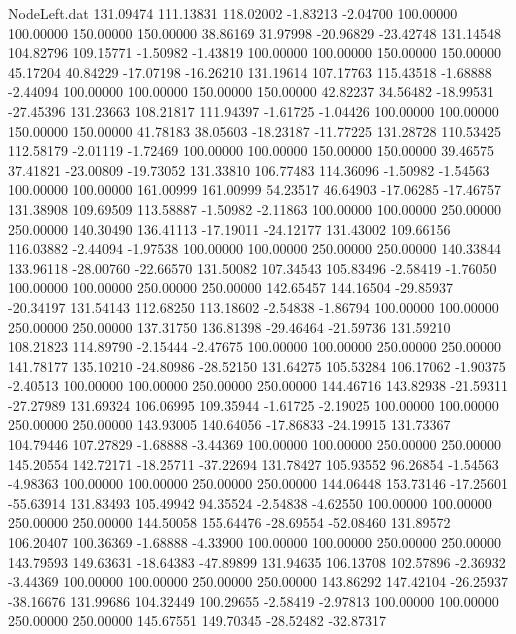 \begin{filecontents}{NodeLeft.dat}
 131.09474  111.13831  118.02002    -1.83213   -2.04700  100.00000  100.00000  150.00000  150.00000   38.86169   31.97998  -20.96829  -23.42748
 131.14548  104.82796  109.15771    -1.50982   -1.43819  100.00000  100.00000  150.00000  150.00000   45.17204   40.84229  -17.07198  -16.26210
 131.19614  107.17763  115.43518    -1.68888   -2.44094  100.00000  100.00000  150.00000  150.00000   42.82237   34.56482  -18.99531  -27.45396
 131.23663  108.21817  111.94397    -1.61725   -1.04426  100.00000  100.00000  150.00000  150.00000   41.78183   38.05603  -18.23187  -11.77225
 131.28728  110.53425  112.58179    -2.01119   -1.72469  100.00000  100.00000  150.00000  150.00000   39.46575   37.41821  -23.00809  -19.73052
 131.33810  106.77483  114.36096    -1.50982   -1.54563  100.00000  100.00000  161.00999  161.00999   54.23517   46.64903  -17.06285  -17.46757
 131.38908  109.69509  113.58887    -1.50982   -2.11863  100.00000  100.00000  250.00000  250.00000  140.30490  136.41113  -17.19011  -24.12177
 131.43002  109.66156  116.03882    -2.44094   -1.97538  100.00000  100.00000  250.00000  250.00000  140.33844  133.96118  -28.00760  -22.66570
 131.50082  107.34543  105.83496    -2.58419   -1.76050  100.00000  100.00000  250.00000  250.00000  142.65457  144.16504  -29.85937  -20.34197
 131.54143  112.68250  113.18602    -2.54838   -1.86794  100.00000  100.00000  250.00000  250.00000  137.31750  136.81398  -29.46464  -21.59736
 131.59210  108.21823  114.89790    -2.15444   -2.47675  100.00000  100.00000  250.00000  250.00000  141.78177  135.10210  -24.80986  -28.52150
 131.64275  105.53284  106.17062    -1.90375   -2.40513  100.00000  100.00000  250.00000  250.00000  144.46716  143.82938  -21.59311  -27.27989
 131.69324  106.06995  109.35944    -1.61725   -2.19025  100.00000  100.00000  250.00000  250.00000  143.93005  140.64056  -17.86833  -24.19915
 131.73367  104.79446  107.27829    -1.68888   -3.44369  100.00000  100.00000  250.00000  250.00000  145.20554  142.72171  -18.25711  -37.22694
 131.78427  105.93552   96.26854    -1.54563   -4.98363  100.00000  100.00000  250.00000  250.00000  144.06448  153.73146  -17.25601  -55.63914
 131.83493  105.49942   94.35524    -2.54838   -4.62550  100.00000  100.00000  250.00000  250.00000  144.50058  155.64476  -28.69554  -52.08460
 131.89572  106.20407  100.36369    -1.68888   -4.33900  100.00000  100.00000  250.00000  250.00000  143.79593  149.63631  -18.64383  -47.89899
 131.94635  106.13708  102.57896    -2.36932   -3.44369  100.00000  100.00000  250.00000  250.00000  143.86292  147.42104  -26.25937  -38.16676
 131.99686  104.32449  100.29655    -2.58419   -2.97813  100.00000  100.00000  250.00000  250.00000  145.67551  149.70345  -28.52482  -32.87317

\end{filecontents}
